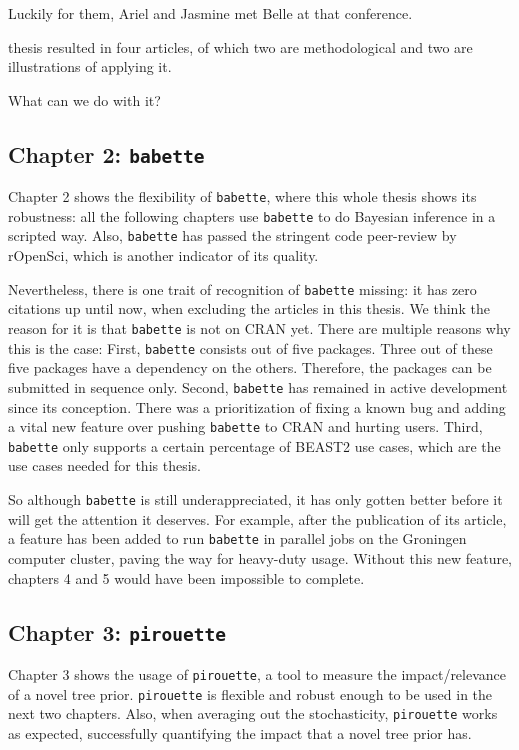 Luckily for them, Ariel and Jasmine met Belle at that conference.





thesis resulted in four articles,
of which two are methodological and two are illustrations
of applying it. 

What can we do with it?


\subsection{Chapter 2: \texttt{babette}}

Chapter 2 shows the flexibility of \verb;babette;, where this whole thesis
shows its robustness: all the following chapters use \verb;babette; to
do Bayesian inference in a scripted way. Also, \verb;babette; has passed
the stringent code peer-review by rOpenSci, which is another indicator of 
its quality.

Nevertheless, there is one trait of recognition of \verb;babette; missing:
it has zero citations up until now, when excluding the articles in this 
thesis. We think the reason for it is that \verb;babette; is
not on CRAN yet. There are multiple reasons why this is the case:
First, \verb;babette; consists out of five packages. Three out of these
five packages have a dependency on the others. Therefore, the packages can
be submitted in sequence only. Second, \verb;babette; has remained in active 
development since its conception. There was a prioritization of 
fixing a known bug and adding a vital new feature over 
pushing \verb;babette; to CRAN and hurting users. Third, \verb;babette;
only supports a certain percentage of BEAST2 use cases, which are the
use cases needed for this thesis. 

So although \verb;babette; is still underappreciated, it has only gotten
better before it will get the attention it deserves. 
For example, after the publication of its article, 
a feature has been added to run \verb;babette; in parallel
jobs on the Groningen computer cluster, paving the way for heavy-duty 
usage. Without this new feature, chapters 4 and 5 would have been
impossible to complete.

\subsection{Chapter 3: \texttt{pirouette}}

Chapter 3 shows the usage of \verb;pirouette;, a tool to measure the
impact/relevance of a novel tree prior. \verb;pirouette; is flexible and
robust enough to be used in the next two chapters. Also, when averaging
out the stochasticity, \verb;pirouette; works as expected, successfully
quantifying the impact that a novel tree prior has.

